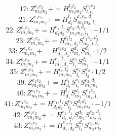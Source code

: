 \documentclass[letterpaper,10pt,fleqn,leqno,onecolumn]{article}
\begin{document}
\begin{equation} \;\;\;\;\;\;  17: Z^{e_{1}e_{2}}_{m_{1}m_{2}}+=H^{l_{1}l_{2}}_{m_{1}m_{2}}S^{e_{1}e_{2}}_{l_{1}l_{2}} \end{equation}
\begin{equation} \;\;\;\;\;\;  21: Z^{e_{1}e_{2}}_{m_{1}m_{2}}+=H^{l_{1}}_{d_{1}}S^{e_{1}e_{2},d_{1}}_{m_{1}m_{2},l_{1}} \end{equation}
\begin{equation} \;\;\;\;\;\;  22: Z^{e_{1}e_{2}}_{m_{1}m_{2}}+=H^{e_{1},l_{1}}_{d_{1}d_{2}}S^{e_{2},d_{1}d_{2}}_{m_{1}m_{2},l_{1}}\cdot -1/1 \end{equation}
\begin{equation} \;\;\;\;\;\;  23: Z^{e_{1}e_{2}}_{m_{1}m_{2}}+=H^{l_{1}l_{2}}_{m_{1},d_{1}}S^{e_{1}e_{2},d_{1}}_{m_{2},l_{1}l_{2}} \end{equation}
\begin{equation} \;\;\;\;\;\;  33: Z^{e_{1}e_{2}}_{m_{1}m_{2}}+=H^{e_{1}e_{2}}_{d_{1},d_{2}}S^{d_{1}}_{m_{1}}S^{d_{2}}_{m_{2}}\cdot 1/2 \end{equation}
\begin{equation} \;\;\;\;\;\;  34: Z^{e_{1}e_{2}}_{m_{1}m_{2}}+=H^{e_{1},l_{1}}_{m_{1},d_{1}}S^{e_{2}}_{l_{1}}S^{d_{1}}_{m_{2}}\cdot -1/1 \end{equation}
\begin{equation} \;\;\;\;\;\;  35: Z^{e_{1}e_{2}}_{m_{1}m_{2}}+=H^{l_{1},l_{2}}_{m_{1}m_{2}}S^{e_{1}}_{l_{1}}S^{e_{2}}_{l_{2}}\cdot 1/2 \end{equation}
\begin{equation} \;\;\;\;\;\;  39: Z^{e_{1}e_{2}}_{m_{1}m_{2}}+=H^{l_{1}}_{d_{1}}S^{e_{1}}_{l_{1}}S^{e_{2},d_{1}}_{m_{1}m_{2}} \end{equation}
\begin{equation} \;\;\;\;\;\;  40: Z^{e_{1}e_{2}}_{m_{1}m_{2}}+=H^{l_{1}}_{d_{1}}S^{d_{1}}_{m_{1}}S^{e_{1}e_{2}}_{m_{2},l_{1}} \end{equation}
\begin{equation} \;\;\;\;\;\;  41: Z^{e_{1}e_{2}}_{m_{1}m_{2}}+=H^{e_{1},l_{1}}_{d_{1}d_{2}}S^{e_{2}}_{l_{1}}S^{d_{1}d_{2}}_{m_{1}m_{2}}\cdot -1/1 \end{equation}
\begin{equation} \;\;\;\;\;\;  42: Z^{e_{1}e_{2}}_{m_{1}m_{2}}+=H^{e_{1},l_{1}}_{d_{1},d_{2}}S^{d_{1}}_{m_{1}}S^{e_{2},d_{2}}_{m_{2},l_{1}} \end{equation}
\begin{equation} \;\;\;\;\;\;  43: Z^{e_{1}e_{2}}_{m_{1}m_{2}}+=H^{e_{1},l_{1}}_{d_{1},d_{2}}S^{d_{1}}_{l_{1}}S^{e_{2},d_{2}}_{m_{1}m_{2}} \end{equation}
\end{document}
